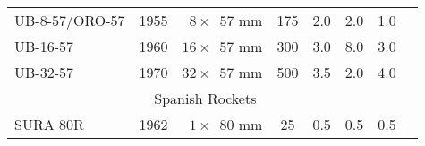 \begin{twocolumntablefloat}
\begin{twocolumntable}
\begin{tabular}{lrcccccl}
\addlinespace
UB-8-57/ORO-57  &1955&$\phantom{0}8 \times \phantom{0}57$ mm&\phantom{0}175&2.0&2.0&1.0\\
UB-16-57        &1960&$\phantom{}16 \times \phantom{0}57$ mm&\phantom{0}300&3.0&8.0&3.0\\
UB-32-57        &1970&$\phantom{}32 \times \phantom{0}57$ mm&\phantom{0}500&3.5&2.0&4.0\\
\midrule
\multicolumn{7}{c}{Spanish Rockets}\\
\midrule
SURA 80R        &1962&$\phantom{0}1 \times \phantom{0}80$ mm&\phantom{00}25&0.5&0.5&0.5\\
\bottomrule
\end{tabular}
\end{twocolumntable}
\end{twocolumntablefloat}
